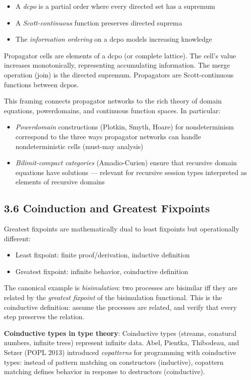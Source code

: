 \documentclass[11pt]{article}
\begin{document}
\begin{itemize}
\item A \emph{dcpo} is a partial order where every directed set has a supremum
\item A \emph{Scott-continuous} function preserves directed suprema
\item The \emph{information ordering} on a dcpo models increasing knowledge
\end{itemize}

Propagator cells are elements of a dcpo (or complete lattice). The cell's
value increases monotonically, representing accumulating information. The
merge operation (join) is the directed supremum. Propagators are
Scott-continuous functions between dcpos.

This framing connects propagator networks to the rich theory of domain
equations, powerdomains, and continuous function spaces. In particular:
\begin{itemize}
\item \emph{Powerdomain} constructions (Plotkin, Smyth, Hoare) for nondeterminism
correspond to the three ways propagator networks can handle nondeterministic
cells (must-may analysis)
\item \emph{Bilimit-compact categories} (Amadio-Curien) ensure that recursive domain
equations have solutions --- relevant for recursive session types interpreted
as elements of recursive domains
\end{itemize}
\subsection{3.6 Coinduction and Greatest Fixpoints}
\label{sec:orgb82fb57}

Greatest fixpoints are mathematically dual to least fixpoints but operationally
different:
\begin{itemize}
\item Least fixpoint: finite proof/derivation, inductive definition
\item Greatest fixpoint: infinite behavior, coinductive definition
\end{itemize}

The canonical example is \emph{bisimulation}: two processes are bisimilar iff they
are related by the \emph{greatest fixpoint} of the bisimulation functional. This is
the coinductive definition: assume the processes are related, and verify that
every step preserves the relation.

\textbf{Coinductive types in type theory}: Coinductive types (streams, conatural
numbers, infinite trees) represent infinite data. Abel, Pientka, Thibodeau,
and Setzer (POPL 2013) introduced \emph{copatterns} for programming with
coinductive types: instead of pattern matching on constructors (inductive),
copattern matching defines behavior in response to destructors (coinductive).
\end{document}
